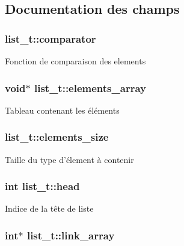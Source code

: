\subsection{Documentation des champs}
\hypertarget{structlist__t_a37b34fd423a00ddc7ad662c29fbd177e}{
\subsubsection[{comparator}]{ list\-\_\-t\-::comparator}}\label{structlist__t_a37b34fd423a00ddc7ad662c29fbd177e}
Fonction de comparaison des elements \hypertarget{structlist__t_a799d9396ef609198dc4dff6456a99bb9}{
\subsubsection[{elements\-\_\-array}]{\setlength{\rightskip}{0pt plus 5cm}void$\ast$ list\-\_\-t\-::elements\-\_\-array}}\label{structlist__t_a799d9396ef609198dc4dff6456a99bb9}
Tableau contenant les éléments \hypertarget{structlist__t_a467978ad64ca202b560905f80a93bf8a}{
\subsubsection[{elements\-\_\-size}]{ list\-\_\-t\-::elements\-\_\-size}}\label{structlist__t_a467978ad64ca202b560905f80a93bf8a}
Taille du type d'élement à contenir \hypertarget{structlist__t_a0c48694d3aca4dbf169881b9df794cb6}{
\subsubsection[{head}]{\setlength{\rightskip}{0pt plus 5cm}int list\-\_\-t\-::head}}\label{structlist__t_a0c48694d3aca4dbf169881b9df794cb6}
Indice de la tête de liste \hypertarget{structlist__t_ae66525dffaeeeda67bd46d8c90fa2863}{
\subsubsection[{link\-\_\-array}]{\setlength{\rightskip}{0pt plus 5cm}int$\ast$ list\-\_\-t\-::link\-\_\-array}}\label{structlist__t_ae66525dffaeeeda67bd46d8c90fa2863}
